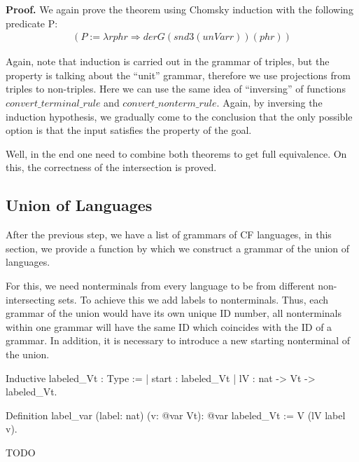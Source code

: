 \textbf{Proof.} 
We again prove the theorem using Chomsky induction with the following predicate P:
\begin{align*}
(P :=  \lambda r phr \Rightarrow der G (snd3 (unVar r)) (phr))
\end{align*}

Again, note that induction is carried out in the grammar of triples, but the property is talking about the ``unit'' grammar, therefore we use projections from triples to non-triples.
Here we can use the same idea of ``inversing'' of functions $convert\_terminal\_rule$ and $convert\_nonterm\_rule$.
Again, by inversing the induction hypothesis, we gradually come to the conclusion that the only possible option is that the input satisfies the property of the goal. 

 


Well, in the end one need to combine both theorems to get full equivalence. On this, the correctness of the intersection is proved.

\subsection{Union of Languages}

After the previous step, we have a list of grammars of CF languages, in this section, we provide a function by which we construct a grammar of the union of languages.

For this, we need nonterminals from every language to be from different non-intersecting sets. To achieve this we add labels to nonterminals. Thus, each grammar of the union would have its own unique ID number, all nonterminals within one grammar will have the same ID which coincides with the ID of a grammar. In addition, it is necessary to introduce a new starting nonterminal of the union.

\begin{listing}[h]
    \begin{pyglist}[language=coq, numbers=none, numbersep=5pt]
  Inductive labeled_Vt : Type :=
  | start : labeled_Vt
  | lV : nat -> Vt -> labeled_Vt.
  
  Definition label_var (label: nat) 
                       (v: @var Vt): @var 
                       labeled_Vt :=
    V (lV label v).  
    \end{pyglist}
    \caption{TODO}
    \label{lst:verbments1}
\end{listing}

